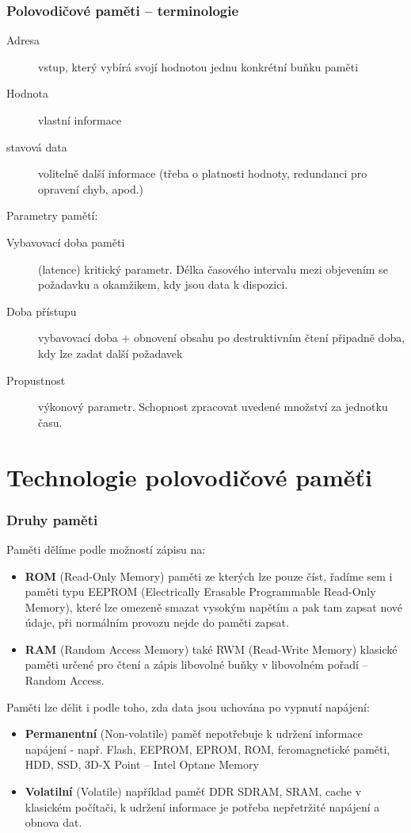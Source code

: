 \documentclass{beamer}
\begin{document}
\begin{frame}
\frametitle{Polovodičové paměti -- terminologie}

\begin{description}
 \item[Adresa] vstup, který vybírá svojí hodnotou jednu konkrétní buňku paměti
 \item[Hodnota] vlastní informace
 \item[stavová data] volitelně další informace (třeba o platnosti hodnoty, redundanci pro opravení chyb, apod.)
\end{description}

Parametry pamětí:

\begin{description}
  \item[Vybavovací doba paměti] (latence) kritický parametr. Délka časového intervalu mezi objevením se požadavku a okamžikem, kdy jsou data k dispozici.
  \item[Doba přístupu] vybavovací doba + obnovení obsahu po destruktivním čtení připadně doba, kdy lze zadat další požadavek
  \item[Propustnost] výkonový parametr. Schopnost zpracovat uvedené množství za jednotku času.
\end{description}

\end{frame}

\section{Technologie polovodičové paměťi}

\begin{frame}
\frametitle{Druhy paměti}

Paměti dělíme podle možností zápisu na:
\begin{itemize}
\item \textbf{ROM} (Read-Only Memory) paměti ze kterých lze pouze číst, řadíme sem i paměti typu EEPROM (Electrically Erasable Programmable Read-Only Memory), které lze omezeně smazat vysokým napětím a pak tam zapsat nové údaje, při normálním provozu nejde do paměti zapsat.
\item \textbf{RAM} (Random Access Memory) také RWM (Read-Write Memory) klasické paměti určené pro čtení a zápis libovolné buňky v libovolném pořadí -- Random Access.
\end{itemize}

Paměti lze dělit i podle toho, zda data jsou uchována po vypnutí napájení:
\begin{itemize}
\item \textbf{Permanentní} (Non-volatile) paměť nepotřebuje k udržení informace napájení - např. Flash, EEPROM, EPROM, ROM, feromagnetické paměti, HDD, SSD, 3D-X Point -- Intel Optane Memory
\item \textbf{Volatilní} (Volatile) například paměť DDR SDRAM, SRAM, cache v klasickém počítači, k udržení informace je potřeba nepřetržité napájení a obnova dat.
\end{itemize}
\end{frame}
\end{document}
